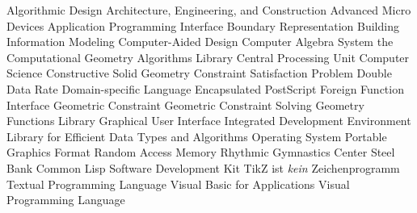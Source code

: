 \begin{acronym}[SO-DIMM]
       {Algorithmic Design}
      {Architecture, Engineering, and Construction}
      {Advanced Micro Devices}
      {Application Programming Interface}
    {Boundary Representation}
      {Building Information Modeling}
      {Computer-Aided Design}
      {Computer Algebra System}
     {the Computational Geometry Algorithms Library}
      {Central Processing Unit}
       {Computer Science}
      {Constructive Solid Geometry}
      {Constraint Satisfaction Problem}
      {Double Data Rate}
      {Domain-specific Language}
      {Encapsulated PostScript}
      {Foreign Function Interface}
       {Geometric Constraint}
      {Geometric Constraint Solving}
      {Geometry Functions Library}
      {Graphical User Interface}
      {Integrated Development Environment}
     {Library for Efficient Data Types and Algorithms}
       {Operating System}
      {Portable Graphics Format}
      {Random Access Memory}
      {Rhythmic Gymnastics Center}
     {Steel Bank Common Lisp}
      {Software Development Kit}
     {TikZ ist \textit{kein} Zeichenprogramm}
      {Textual Programming Language}
      {Visual Basic for Applications}
      {Visual Programming Language}
\end{acronym}
